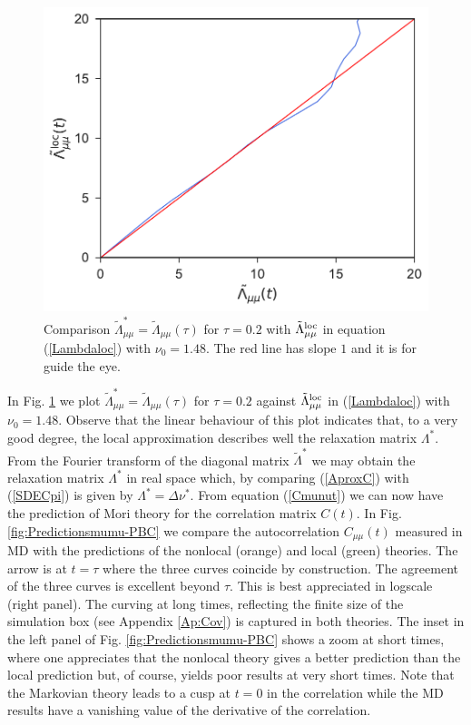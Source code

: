 \documentclass[b5paper,openright,10pt]{book}
\begin{document}
\begin{figure}[h!]
  \centering
\includegraphics[scale=0.41]{CompareLambdas-PBC}
\caption[Comparison $\tilde{\Lambda}^*_{\mu\mu}$ and $\tilde{\Lambda}_{\mu\mu}(\tau)$ for an unconfined fluid]{Comparison $\tilde{\Lambda}^*_{\mu\mu}=\tilde{\Lambda}_{\mu\mu}(\tau)$ for $\tau=0.2$ with $\tilde{\Lambda}^{\rm loc}_{\mu\mu}$ in equation (\ref{Lambdaloc}) with $\nu_0=1.48$. The red line has slope $1$ and it is for guide the eye.}
\label{fig:CompareLambdas-PBC}
\end{figure}
In         Fig.           \ref{fig:CompareLambdas-PBC}         we         plot
$\tilde{\Lambda}^*_{\mu\mu}=\tilde{\Lambda}_{\mu\mu}(\tau)$        for
$\tau=0.2$    against    $\tilde{\Lambda}_{\mu\mu}^{\rm    loc}$    in
(\ref{Lambdaloc})   with  $\nu_0=1.48$. Observe that the linear behaviour of this plot
indicates  that,  to  a  very good  degree,  the  local  approximation
describes well the relaxation matrix $\Lambda^*$.
From the Fourier transform  of the diagonal matrix $\tilde{\Lambda}^*$
we may  obtain the relaxation  matrix $\Lambda^*$ in real space which,  by comparing
(\ref{AproxC})      with     (\ref{SDECpi})      is     given      by
$\Lambda^*=\Delta\nu^*$. From equation  (\ref{Cmunut}) we can
now  have the  prediction of  Mori theory  for the  correlation matrix
$C(t)$.  In Fig.  \ref{fig:Predictionsmumu-PBC} we compare the autocorrelation
$C_{\mu\mu}(t)$ measured in  MD with the predictions  of the nonlocal
(orange) and local  (green) theories.  The arrow is at  $t=\tau$ where the
three curves  coincide by  construction.  The  agreement of  the three
curves  is  excellent beyond  $\tau$.   This  is best  appreciated  in
logscale (right panel). The curving at long times,
reflecting the  finite size  of the simulation  box (see  Appendix \ref{Ap:Cov}) is
captured in  both theories.  The inset  in the left panel of Fig.  \ref{fig:Predictionsmumu-PBC}
shows a zoom at short times,  where one appreciates that the nonlocal
theory gives  a better  prediction than the  local prediction  but, of
course,  yields  poor results  at  very  short  times. Note  that  the
Markovian theory leads to a cusp at $t=0$ in the correlation while the
MD  results  have   a  vanishing  value  of  the   derivative  of  the
correlation.
\end{document}
